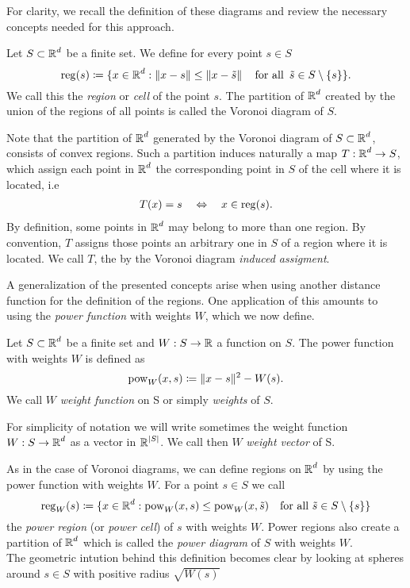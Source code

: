 \documentclass[
     12pt,         %
     a4paper,      %
     BCOR=10mm,     %
     DIV=14,        %
     ]{scrreprt}
\begin{document}
    For clarity, we recall the definition of these diagrams and review the necessary concepts needed for this approach. 
    \begin{defi}
        Let $S\subset \operatorname{\mathbb{R}}^d$ be a finite set.  We define for every point $s\in S$
        \[\reg(s) \coloneqq \{x \in \R^d : \|x-s\| \le \|x-\tilde s \| \quad  \forAll \tilde s \in S\setminus \{s\} \}. \]
        We call this the \textit{region} or \textit{cell} of the point $s$.
        The partition of $\operatorname{\mathbb{R}}^d$ created by the union of the regions of all points is called the Voronoi diagram of $S$.
    \end{defi}
    \begin{rem}
        Note that the partition of $\operatorname{\mathbb{R}}^d$ generated by the Voronoi diagram of $S\subset \operatorname{\mathbb{R}}^d$, consists of convex regions.  Such a partition induces naturally a map $T: \operatorname{\mathbb{R}}^d \to S$, which assign each point in $\operatorname{\mathbb{R}}^d$ the corresponding 
        point in $S$ of the cell where it is located, i.e
         \begin{align} \label{eq::reg}
             T(x) = s \quad \Leftrightarrow \quad x\in \operatorname{reg}(s).  
         \end{align}
         By definition, some points in $\operatorname{\mathbb{R}}^d$ may belong to more than one region.  By convention, $T$ assigns those points an arbitrary one in $S$ of a region
         where it is located. We call $T$, the by the Voronoi diagram \textit{induced assigment}. 
    \end{rem}
    A generalization of the presented concepts arise when using another distance function for the definition of the regions. 
    One application of this amounts to using the \textit{power function} with weights $W$, which we now define.

    \begin{defi}      
        Let $S\subset \operatorname{\mathbb{R}}^d$ be a finite set and $W: S \to \operatorname{\mathbb{R}} $ a function on $S$. The power function with weights $W$ is defined as
        \[ \operatorname{pow}_W(x,s) \coloneqq \|x-s\|^2 - W(s). \]
        We call $W$ \textit{weight function} on S or simply \textit{weights} of $S$.
    \end{defi}
    \begin{rem}
        For simplicity of notation we will write sometimes the weight function \\ $W:S\to\operatorname{\mathbb{R}}^d$ as a vector in $\operatorname{\mathbb{R}}^{|S|}$. We call then $W$ \textit{weight vector} of S.
    \end{rem}
    As in the case of Voronoi diagrams, we can define regions on $\operatorname{\mathbb{R}}^d$ by using the power function with weights $W$.
    For a point $s\in S$ we call 
    \[\operatorname{reg}_W(s) \coloneqq \{x \in \operatorname{\mathbb{R}}^d : \operatorname{pow}_W(x,s) \le \operatorname{pow}_W(x,\tilde s) \quad  \text{for all } \tilde s \in S\setminus \{s\} \} \]
    the \textit{power region} (or \textit{power cell}) of $s$ with weights $W$. Power regions also create a partition of $\operatorname{\mathbb{R}}^d$ which is called the \textit{power diagram} of $S$ with weights $W$. \\
    The geometric intution behind this definition becomes clear by looking at spheres around $s\in S$ with positive radius $\sqrt {W(s)}$
    
\end{document}
